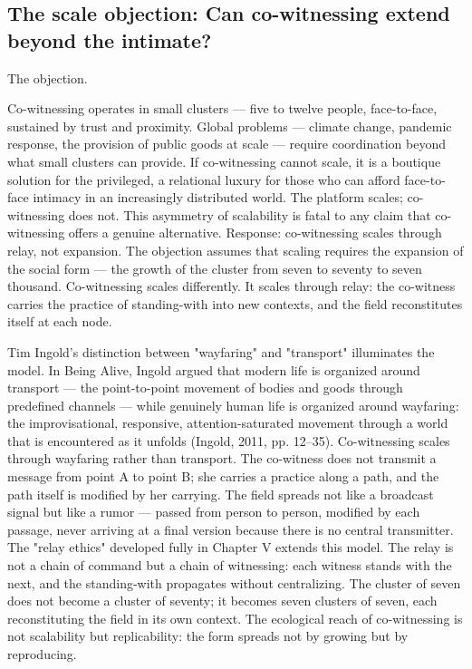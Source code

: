 \subsection{The scale objection: Can co-witnessing extend beyond the intimate?}

The objection.

Co-witnessing operates in small clusters — five to twelve people, face-to-face, sustained by trust and proximity. Global problems — climate change, pandemic response, the provision of public goods at scale — require coordination beyond what small clusters can provide. If co-witnessing cannot scale, it is a boutique solution for the privileged, a relational luxury for those who can afford face-to-face intimacy in an increasingly distributed world. The platform scales; co-witnessing does not. This asymmetry of scalability is fatal to any claim that co-witnessing offers a genuine alternative. Response: co-witnessing scales through relay, not expansion. The objection assumes that scaling requires the expansion of the social form — the growth of the cluster from seven to seventy to seven thousand. Co-witnessing scales differently. It scales through relay: the co-witness carries the practice of standing-with into new contexts, and the field reconstitutes itself at each node.

Tim Ingold's distinction between "wayfaring" and "transport" illuminates the model. In Being Alive, Ingold argued that modern life is organized around transport — the point-to-point movement of bodies and goods through predefined channels — while genuinely human life is organized around wayfaring: the improvisational, responsive, attention-saturated movement through a world that is encountered as it unfolds (Ingold, 2011, pp. 12–35). Co-witnessing scales through wayfaring rather than transport. The co-witness does not transmit a message from point A to point B; she carries a practice along a path, and the path itself is modified by her carrying. The field spreads not like a broadcast signal but like a rumor — passed from person to person, modified by each passage, never arriving at a final version because there is no central transmitter. The "relay ethics" developed fully in Chapter V extends this model. The relay is not a chain of command but a chain of witnessing: each witness stands with the next, and the standing-with propagates without centralizing. The cluster of seven does not become a cluster of seventy; it becomes seven clusters of seven, each reconstituting the field in its own context. The ecological reach of co-witnessing is not scalability but replicability: the form spreads not by growing but by reproducing.

